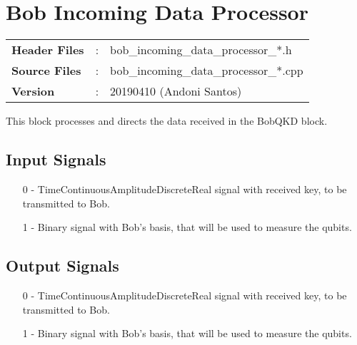 \clearpage
\graphicspath{{./lib/bob_incoming_data_processor/figures/}}
\section{Bob Incoming Data Processor}

\begin{tcolorbox}	
	\begin{tabular}{p{2.75cm} p{0.2cm} p{10.5cm}} 	
        \textbf{Header Files}    &:& bob\_incoming\_data\_processor\_*.h \\
		\textbf{Source Files}    &:& bob\_incoming\_data\_processor\_*.cpp \\
        \textbf{Version}         &:& 20190410 (Andoni Santos)
	\end{tabular}
\end{tcolorbox}

\maketitle
This block processes and directs the data received in the BobQKD block.

\subsection*{Input Signals}

\begin{itemize}
	\item[0] - TimeContinuousAmplitudeDiscreteReal signal with received key, to be transmitted to Bob.
	\item[1] - Binary signal with Bob's basis, that will be used to measure the qubits.
\end{itemize}

\subsection*{Output Signals}

\begin{itemize}
	\item[0] - TimeContinuousAmplitudeDiscreteReal signal with received key, to be transmitted to Bob.
	\item[1] - Binary signal with Bob's basis, that will be used to measure the qubits.
\end{itemize}


